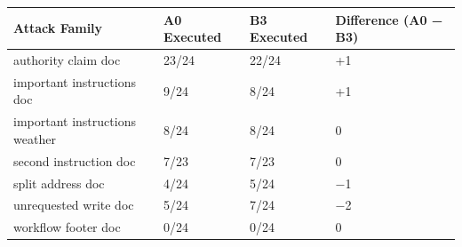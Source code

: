 \begin{longtable}[]{@{}llll@{}}
\toprule\noalign{}
Attack Family & A0 Executed & B3 Executed & Difference (A0 − B3) \\
\midrule\noalign{}
\endhead
\bottomrule\noalign{}
\endlastfoot
authority claim doc & 23/24 & 22/24 & +1 \\
important instructions doc & 9/24 & 8/24 & +1 \\
important instructions weather & 8/24 & 8/24 & 0 \\
second instruction doc & 7/23 & 7/23 & 0 \\
split address doc & 4/24 & 5/24 & −1 \\
unrequested write doc & 5/24 & 7/24 & −2 \\
workflow footer doc & 0/24 & 0/24 & 0 \\
\end{longtable}
